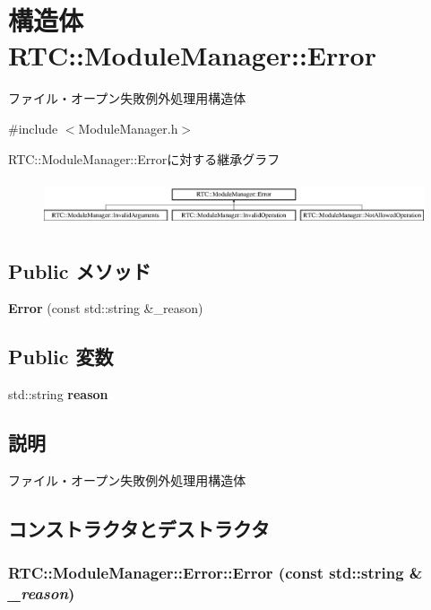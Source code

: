 \section{構造体 RTC::ModuleManager::Error}
\label{structRTC_1_1ModuleManager_1_1Error}


ファイル・オープン失敗例外処理用構造体  




{\ttfamily \#include $<$ModuleManager.h$>$}

RTC::ModuleManager::Errorに対する継承グラフ\begin{figure}[H]
\begin{center}
\leavevmode
\includegraphics[height=1.38786cm]{structRTC_1_1ModuleManager_1_1Error}
\end{center}
\end{figure}
\subsection*{Public メソッド}
\begin{DoxyCompactItemize}
\item 
{\bf Error} (const std::string \&\_\-reason)
\end{DoxyCompactItemize}
\subsection*{Public 変数}
\begin{DoxyCompactItemize}
\item 
std::string {\bf reason}
\end{DoxyCompactItemize}


\subsection{説明}
ファイル・オープン失敗例外処理用構造体 

\subsection{コンストラクタとデストラクタ}
\subsubsection[{Error}]{\setlength{\rightskip}{0pt plus 5cm}RTC::ModuleManager::Error::Error (const std::string \& {\em \_\-reason})\hspace{0.3cm}{\ttfamily  [inline]}}\label{structRTC_1_1ModuleManager_1_1Error_a56f039f9b9dbb5917cce4e9cd99ce01b}


